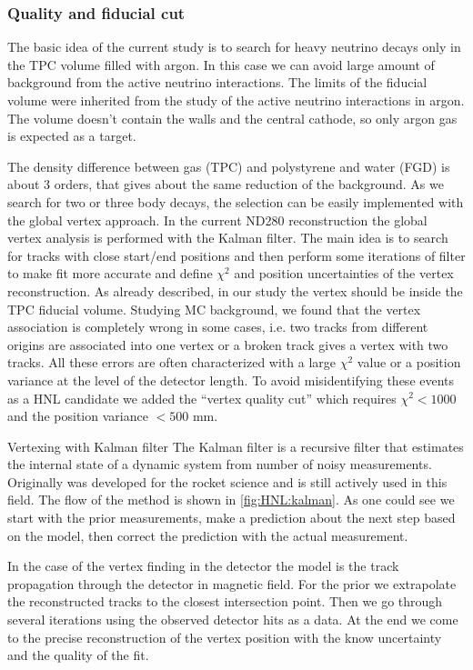 \documentclass[../main.tex]{subfiles}
\begin{document}
\subsubsection{Quality and fiducial cut}
\label{sec:HNL:qf}
The basic idea of the current study is to search for heavy neutrino decays only in the TPC volume filled with argon. In this case we can avoid large amount of background from the active neutrino interactions. The limits of the fiducial volume were inherited from the study of the active neutrino interactions in argon. The volume doesn't contain the walls and the central cathode, so only argon gas is expected as a target.

The density difference between gas (TPC) and polystyrene and water (FGD) is about 3 orders, that gives about the same reduction of the background. As we search for two or three body decays, the selection can be easily implemented with the global vertex approach. In the current ND280 reconstruction the global vertex analysis is performed with the Kalman filter. The main idea is to search for tracks with close start/end positions and then perform some iterations of filter to make fit more accurate and define $\chi^2$ and position uncertainties of the vertex reconstruction. As already described, in our study the vertex should be inside the TPC fiducial volume. Studying MC background, we found that the vertex association is completely wrong in some cases, i.e. two tracks from different origins are associated into one vertex or a broken track gives a vertex with two tracks. All these errors are often characterized with a large $\chi^2$ value or a position variance at the level of the detector length. To avoid misidentifying these events as a HNL candidate we added the ``vertex quality cut'' which requires $\chi^2<1000$ and the position variance $<500$ mm.

\begin{bclogo}[couleur=blue!2, arrondi=0.1, logo=\bcinfo, nobreak=true]{Vertexing with Kalman filter}
    The Kalman filter is a recursive filter that estimates the internal state of a dynamic system from number of noisy measurements. Originally was developed for the rocket science and is still actively used in this field. The flow of the method is shown in \autoref{fig:HNL:kalman}. As one could see we start with the prior measurements, make a prediction about the next step based on the model, then correct the prediction with the actual measurement.

    In the case of the vertex finding in the detector the model is the track propagation through the detector in magnetic field. For the prior we extrapolate the reconstructed tracks to the closest intersection point. Then we go through several iterations using the observed detector hits as a data. At the end we come to the precise reconstruction of the vertex position with the know uncertainty and the quality of the fit.
\end{bclogo}
\end{document}
